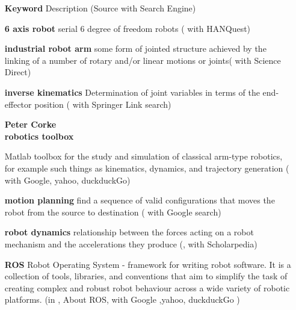 	\begin{itemize} [leftmargin=3cm]
		\item[\textbf{Keyword}] Description (Source with Search Engine)
		\item [\textbf{6 axis robot}] serial 6 degree of freedom robots (\cite{6axisRobot} with HANQuest)
		\item [\textbf{industrial robot arm}]  some form of jointed structure  achieved by the linking of a number of rotary and/or linear motions or joints( \cite{IndustrialRobotArm} with Science Direct)
		\item [\textbf{inverse kinematics}] Determination of joint variables in terms of the end-effector position 
		(\cite{Jazar2007} with Springer Link search)
		\item[{\parbox[t]{0.25\linewidth}{\raggedright\textbf{Peter Corke \\ robotics toolbox}}}] \parbox[t]{1\linewidth}{Matlab toolbox for the study and simulation of classical arm-type robotics, for example such things as kinematics, dynamics, and  trajectory generation (\cite{CorkeRoboticsToolbox} with Google, yahoo, duckduckGo)}
		\item [\textbf{motion planning}]  find a sequence of valid configurations that moves the robot from the source to destination (\cite{MotionPlanning} with Google search)
		\item [\textbf{robot dynamics}] relationship between the forces acting on a robot mechanism and the accelerations they produce (\cite{RobotDynamics}, with Scholarpedia)
		\item [\textbf{ROS}] Robot Operating System - framework for writing robot software. It is a collection of tools, libraries, and conventions that aim to simplify the task of creating complex and robust robot behaviour across a wide variety of robotic platforms. (in \cite{ROS}, About ROS, with Google ,yahoo, duckduckGo ) 
\end{itemize} 
\medskip


